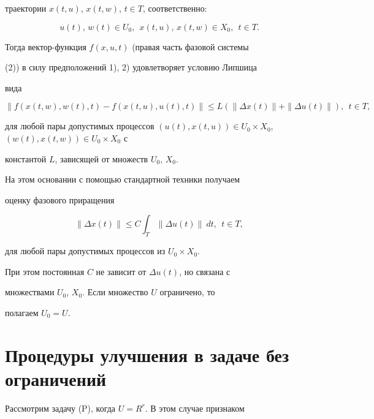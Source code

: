 траектории $x(t, u)$, $x(t, w)$, $t \in T$, соответственно:


$$


u(t),\, w(t) \in U_{0},\ \ x(t, u),\, x(t, w) \in X_{0},\ \ t \in T.


$$


Тогда вектор-функция $f(x, u, t)$ (правая часть фазовой системы


(2)) в силу предположений 1), 2) удовлетворяет условию Липшица


вида


$$


\| f(x(t, w), w(t), t) - f(x(t, u), u(t), t) \| \leq


L (\| \Delta x(t) \|+\| \Delta u(t) \|),\ \ t \in T,


$$


для любой пары допустимых процессов $(u(t),x(t,u)) \in U_{0}


\times X_{0}$, $(w(t),x(t,w)) \in U_{0} \times X_{0}$ с


константой $L$, зависящей от множеств $U_{0}$, $X_{0}$.





На этом основании с помощью стандартной техники получаем


оценку фазового приращения


\begin{equation}


\| \Delta x(t) \| \leq C \int_{T} \| \Delta u(t) \|~dt,\ \ t \in T,


\end{equation}


для любой пары допустимых процессов из $U_{0} \times X_{0}$.


При этом постоянная $C$ не зависит от $\Delta u(t)$, но связана с


множествами $U_{0}$, $X_{0}$. Если множество $U$ ограничено, то


полагаем $U_{0}=U$.





\section{Процедуры улучшения в задаче без ограничений}





Рассмотрим задачу (P), когда $U=R^{r}$. В этом случае признаком


